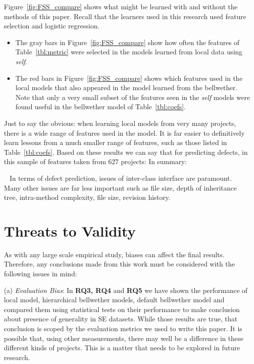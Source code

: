 \documentclass[10pt,journal,compsoc]{IEEEtran}
\newcommand{\fig}[1]{Figure~\ref{fig:#1}}
\newenvironment{RQ}[1]%
{\noindent\begin{minipage}[c]{\linewidth}%
\begin{bclogo}[couleur=gray!20,%
                arrondi=0.1,logo=\bctrombone,%
                ombre=true%
                ]{{\small  ~#1}}}%
{\end{bclogo}\vspace{2mm}\end{minipage}}
\newcommand{\respto}[1]{
\fcolorbox{black}{black!15}{%
\label{resp:#1}%
\bf\scriptsize R{#1}}}
\begin{document}
\fig{FSS_compare} shows what might be learned with and without
the methods of this paper. Recall that the learners used in this research used feature selection and  logistic regression.
\begin{itemize}
\item  The gray bars in \fig{FSS_compare} show how often the features
of Table~\ref{tbl:metric} were selected in the models learned from
local data using {\em self}. 
\item
The red bars in \fig{FSS_compare} shows which features
used in the local models that also appeared in the model learned from the bellwether. 
  Note that only a very
small subset of the features seen in the  {\em self} models
were found useful in the bellwether model of Table~\ref{tbl:coefs}.
\end{itemize}
Just to say the obvious:
when learning
local models from very many projects, there is a wide range 
of features used in the model.
It is far easier to 
definitively learn lessons from a much smaller range
of features, such as those listed in Table~\ref{tbl:coefs}.
Based on these results
we can say that for predicting defects, in this sample of  features taken from 627 projects:
In summary:

\begin{RQ}
{\respto{2-9} {\color{blue}In terms of defect prediction,
issues of inter-class interface are paramount.
Many other  issues are far less important such as file size, depth of inheritance tree, intra-method complexity, file size, revision history.}}
\end{RQ}

 

\section{Threats to Validity}
\label{sec:validity}

As with any large scale empirical study, biases can affect the final
results. Therefore, any conclusions made from this work
must be considered with the following issues in mind:

(a) \textit{Evaluation Bias}: 
In  {\bf  RQ3, RQ4} and {\bf RQ5} we have shown the performance of local model, hierarchical bellwether models, default bellwether model and compared them using statistical tests on their performance to make conclusion about presence of generality in SE datasets. While those results are true, that conclusion is scoped by the evaluation metrics we used to write this paper. It is possible that, using other measurements, there may well be a difference in these different kinds of projects. This is a matter that needs to be explored in future research.  
\end{document}
